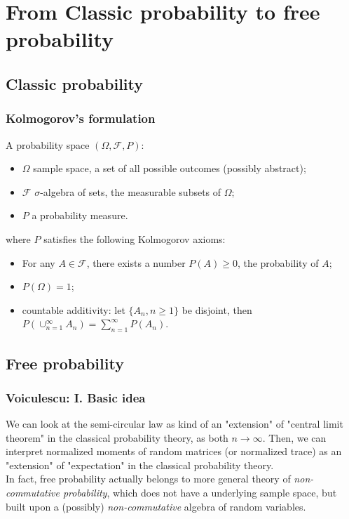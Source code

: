 \documentclass{beamer}
\begin{document}
\section{From Classic probability to free probability}
\subsection{Classic probability}
\begin{frame}
\frametitle{Kolmogorov's formulation} 
A probability space $(\Omega, \mathcal{F}, P)$:\\
\begin{itemize}
\item $\Omega$ sample space, a set of all possible outcomes (possibly abstract);
\item $\mathcal{F}$ $\sigma$-algebra of sets, the measurable subsets of $\Omega$;
\item $P$ a probability measure.
\end{itemize}
where $P$ satisfies the following Kolmogorov axioms:
\begin{itemize}
\item For any $A \in \mathcal{F}$, there exists a number $P(A) \geq 0$, the probability of $A$;
\item $P(\Omega) = 1$;
\item countable additivity: let $\{A_n, n\geq 1\}$ be disjoint, then $P(\cup_{n=1}^{\infty} A_n) = \sum_{n=1}^{\infty} P(A_n)$.
\end{itemize}
\end{frame}

\subsection{Free probability}
\begin{frame}
\frametitle{Voiculescu: I. Basic idea}
We can look at the semi-circular law as kind of an "extension" of "central limit theorem" in the classical probability theory, as both $n \rightarrow \infty   $. Then, we can interpret normalized moments of random matrices (or normalized trace) as an "extension" of "expectation" in the classical probability theory. \\
In fact, free probability actually belongs to more general theory of \textit{non-commutative probability}, which does not have a underlying sample space, but built upon a (possibly) \textit{non-commutative} algebra of random variables. 
\end{frame}
\end{document}
